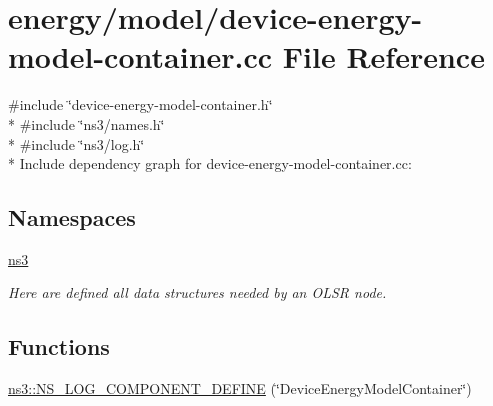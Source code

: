 \hypertarget{device-energy-model-container_8cc}{}\section{energy/model/device-\/energy-\/model-\/container.cc File Reference}
\label{device-energy-model-container_8cc}
{\ttfamily \#include \char`\"{}device-\/energy-\/model-\/container.\+h\char`\"{}}\\*
{\ttfamily \#include \char`\"{}ns3/names.\+h\char`\"{}}\\*
{\ttfamily \#include \char`\"{}ns3/log.\+h\char`\"{}}\\*
Include dependency graph for device-\/energy-\/model-\/container.cc\+:
\subsection*{Namespaces}
\begin{DoxyCompactItemize}
\item 
 \hyperlink{namespacens3}{ns3}
\begin{DoxyCompactList}\small\item\em Here are defined all data structures needed by an O\+L\+SR node. \end{DoxyCompactList}\end{DoxyCompactItemize}
\subsection*{Functions}
\begin{DoxyCompactItemize}
\item 
\hyperlink{namespacens3_a8f3bfcafa6db73eae4a4c8a15bb08b31}{ns3\+::\+N\+S\+\_\+\+L\+O\+G\+\_\+\+C\+O\+M\+P\+O\+N\+E\+N\+T\+\_\+\+D\+E\+F\+I\+NE} (\char`\"{}Device\+Energy\+Model\+Container\char`\"{})
\end{DoxyCompactItemize}
